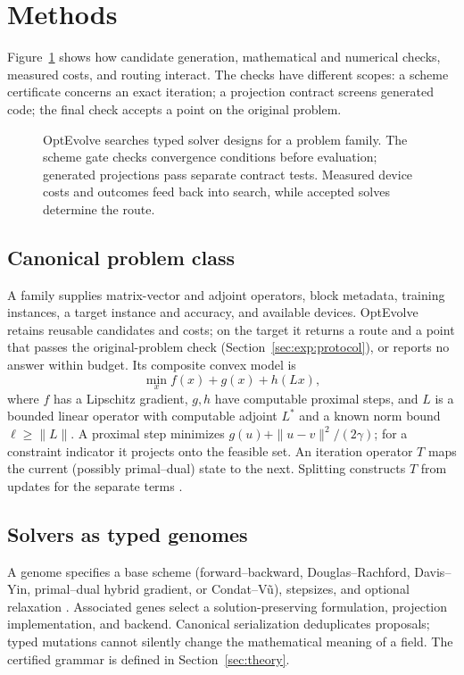 \section{Methods}
\label{sec:methods}

Figure~\ref{fig:framework} shows how candidate generation, mathematical and
numerical checks, measured costs, and routing interact. The checks have
different scopes: a scheme certificate concerns an exact iteration; a
projection contract screens generated code; the final check accepts a point
on the original problem.

\begin{figure}[H]
\centering
\resizebox{\linewidth}{!}{}
\caption{OptEvolve searches typed solver designs for a problem family. The
scheme gate checks convergence conditions before evaluation; generated
projections pass separate contract tests. Measured device costs and outcomes
feed back into search, while accepted solves determine the route.}
\label{fig:framework}
\end{figure}

\subsection{Canonical problem class}
A family supplies matrix-vector and adjoint operators, block metadata, training instances, a target instance and accuracy, and available devices. OptEvolve retains reusable candidates and costs; on the target it returns a route and a point that passes the original-problem check (Section~\ref{sec:exp:protocol}), or reports no answer within budget. Its composite convex model is
\begin{equation}
\min_x f(x)+g(x)+h(Lx),\label{eq:composite}
\end{equation}
where $f$ has a Lipschitz gradient, $g,h$ have computable proximal steps, and 
$L$ is a bounded linear operator with computable adjoint $L^\ast$ and a known norm bound $\ell \ge \|L\|$.
A proximal step minimizes $g(u)+\|u-v\|^2/(2\gamma)$; for a constraint indicator it projects onto the feasible set. An iteration operator $T$ maps the current (possibly primal--dual) state to the next. Splitting constructs $T$ from updates for the separate terms \citep{RyuYin2022LargeScale}.

\subsection{Solvers as typed genomes}
\label{sec:genome}
A genome specifies a base scheme (forward--backward, Douglas--Rachford, Davis--Yin, primal--dual hybrid gradient, or Condat--V\~u), stepsizes, and optional relaxation \citep{ChambollePock2011First,Condat2013Primal,Vu2013Splitting}. Associated genes select a solution-preserving formulation, projection implementation, and backend. Canonical serialization deduplicates proposals; typed mutations cannot silently change the mathematical meaning of a field. The certified grammar is defined in Section~\ref{sec:theory}.


